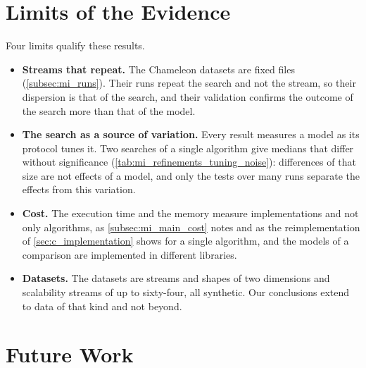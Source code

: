 \section{Limits of the Evidence}
\label{sec:limits}

Four limits qualify these results.

\begin{itemize}
    \item \textbf{Streams that repeat.} The Chameleon datasets are fixed files (\cref{subsec:mi_runs}). Their runs repeat the search and not the stream, so their dispersion is that of the search, and their validation confirms the outcome of the search more than that of the model.
    \item \textbf{The search as a source of variation.} Every result measures a model as its protocol tunes it. Two searches of a single algorithm give medians that differ without significance (\cref{tab:mi_refinements_tuning_noise}): differences of that size are not effects of a model, and only the tests over many runs separate the effects from this variation.
    \item \textbf{Cost.} The execution time and the memory measure implementations and not only algorithms, as \cref{subsec:mi_main_cost} notes and as the reimplementation of \cref{sec:c_implementation} shows for a single algorithm, and the models of a comparison are implemented in different libraries.
    \item \textbf{Datasets.} The datasets are streams and shapes of two dimensions and scalability streams of up to sixty-four, all synthetic. Our conclusions extend to data of that kind and not beyond.
\end{itemize}

\section{Future Work}
\label{sec:future_work}

